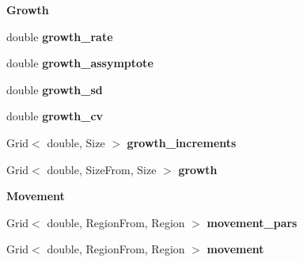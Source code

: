 \begin{Indent}{\bf Growth}\par
\begin{DoxyCompactItemize}
\item 
\hypertarget{classIOSKJ_1_1Model_a37a3bf07009aa97913f40e58110e8bdf}{double {\bfseries growth\-\_\-rate}}\label{classIOSKJ_1_1Model_a37a3bf07009aa97913f40e58110e8bdf}

\item 
\hypertarget{classIOSKJ_1_1Model_a02f4a83466509247a77ecec82980aa5b}{double {\bfseries growth\-\_\-assymptote}}\label{classIOSKJ_1_1Model_a02f4a83466509247a77ecec82980aa5b}

\item 
\hypertarget{classIOSKJ_1_1Model_ac4a5b947f4c8f00a43d40dde17374222}{double {\bfseries growth\-\_\-sd}}\label{classIOSKJ_1_1Model_ac4a5b947f4c8f00a43d40dde17374222}

\item 
\hypertarget{classIOSKJ_1_1Model_a52e9d3dbf85db8de068b3843c7769ef7}{double {\bfseries growth\-\_\-cv}}\label{classIOSKJ_1_1Model_a52e9d3dbf85db8de068b3843c7769ef7}

\item 
\hypertarget{classIOSKJ_1_1Model_a15c6035b5dd0054a13170f992493d401}{Grid$<$ double, Size $>$ {\bfseries growth\-\_\-increments}}\label{classIOSKJ_1_1Model_a15c6035b5dd0054a13170f992493d401}

\item 
\hypertarget{classIOSKJ_1_1Model_a148988f9ac9954efbd49276483238de3}{Grid$<$ double, Size\-From, Size $>$ {\bfseries growth}}\label{classIOSKJ_1_1Model_a148988f9ac9954efbd49276483238de3}

\end{DoxyCompactItemize}
\end{Indent}
\begin{Indent}{\bf Movement}\par
\begin{DoxyCompactItemize}
\item 
\hypertarget{classIOSKJ_1_1Model_a6bdae888c4dcda2b3cd1f7320a56527c}{Grid$<$ double, Region\-From, Region $>$ {\bfseries movement\-\_\-pars}}\label{classIOSKJ_1_1Model_a6bdae888c4dcda2b3cd1f7320a56527c}

\item 
\hypertarget{classIOSKJ_1_1Model_a6a34ad6c498bab48181a8339bd6e912e}{Grid$<$ double, Region\-From, Region $>$ {\bfseries movement}}\label{classIOSKJ_1_1Model_a6a34ad6c498bab48181a8339bd6e912e}

\end{DoxyCompactItemize}
\end{Indent}
